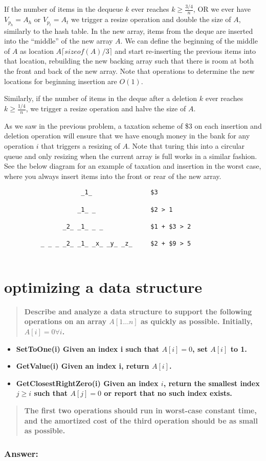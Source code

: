 \documentclass[titlepage]{article}\usepackage[]{graphicx}\usepackage[]{color}
\begin{document}
If the number of items in the dequeue $k$ ever reaches $ k \geq \frac{3/4}n$,
OR we ever have $V_{p_h} = A_h$ or $V_{p_t} = A_t$ we trigger a resize
operation and double the size of $A$, similarly to the hash table. In the new
array, items from the deque are inserted into the ``middle'' of the new array
$A$. We can define the beginning of the middle of $A$ as location
$A\lceil sizeof(A)/3 \rceil $ and start re-inserting the previous items into that location,
rebuilding the new backing array such that there is room at both the front
and back of the new array. Note that operations to determine the new
locations for beginning insertion are $O(1)$.

Similarly, if the number of items in the deque after a deletion $k$ 
ever reaches $ k \geq \frac{1/4}n$, we trigger a resize
operation and halve the size of $A$. 

As we saw in the previous problem, a taxation scheme of \$3 on each insertion
and deletion operation will ensure that we have enough money in the bank for
any operation $i$ that triggers a resizing of $A$. Note that turing this into a
circular queue and only resizing when the current array is full works in a
similar fashion. See the below diagram for an example of taxation and insertion
in the worst case, where you always insert items into the front or rear of the
new array.

\begin{verbatim}
                     _1_                $3  

                    _1_ _               $2 > 1

                _2_ _1_ _ _             $1 + $3 > 2

          _ _ _ _2_ _1_ _x_ _y_ _z_     $2 + $9 > 5
            
\end{verbatim}

\section{optimizing a data structure}
\begin{quote}
  \textbf{Describe and analyze a data structure to support the following
	operations on an array $A[1\dots n]$ as quickly as possible. Initially, $A[i]
  = 0 \forall i$.}
\end{quote}

\begin{itemize}
  \item \textbf{SetToOne(i) Given an index i such that $A[i] = 0$, set $A[i]$ to 1.}
  \item \textbf{GetValue(i) Given an index i, return $A[i]$. }
  \item \textbf{GetClosestRightZero(i) Given an index $i$, return the smallest
	index $j \geq i$ such that $A[j] = 0$ or report that no such index exists.}
\end{itemize}
\begin{quote}
  \textbf{The first two operations should run in worst-case constant time, and
  the amortized cost of the third operation should be as small as possible.}
\end{quote}

\subsubsection{Answer: }
\end{document}
